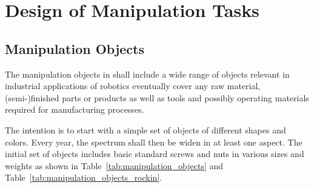 \section{Design of Manipulation Tasks}
\label{sec:ManipulationTasks}

\subsection{Manipulation Objects}
The manipulation objects in \RCAW shall include a wide range of objects relevant in industrial applications of robotics eventually cover any raw material, (semi-)finished parts or products as well as tools and possibly operating materials required for manufacturing processes.
\par
The intention is to start with a simple set of objects of different shapes and colors. Every year, the spectrum shall then be widen in at least one aspect. The initial set of objects includes basic standard screws and nuts in various sizes and weights as shown in Table~\ref{tab:manipulation_objects} and Table~\ref{tab:manipulation_objects_rockin}. 

\newcommand{\imageView}[1]{\texttt{[image: \#1]}}



